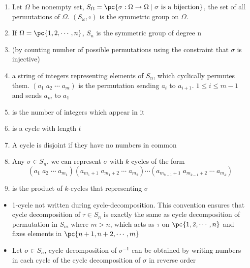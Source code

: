 \documentclass[11pt]{article}
\begin{document}
\begin{definition*}
    \begin{enumerate}
        \item {} Let $\Omega$ be nonempty set, $S_{\Omega} = \pc{\sigma: \Omega \to \Omega \mid \sigma \text{ is a bijection}}$, the set of all permutations of $\Omega$. $(S_{\omega}, \circ)$ is the symmetric group on $\Omega$.
        \item {} If $\Omega = \pc{1,2,\cdots,n}$, $S_n$ is the symmetric group of degree n
        \item {} (by counting number of possible permutations using the constraint that $\sigma$ is injective) 
        \item {} a string of integers representing elements of $S_n$, which cyclically permutes them. $(a_1 \; a_2 \; \cdots \; a_m)$ is the permutation sending $a_i$ to $a_{i+1}$. $1\leq i \leq m-1$ and sends $a_m$ to $a_1$
        \item {} is the number of integers which appear in it
        \item {} is a cycle with length $t$
        \item {} A cycle is disjoint if they have no numbers in common
        \item {} Any $\sigma\in S_n$, we can represent $\sigma$ with $k$ cycles of the form 
        \[
            (a_1 \; a_2\; \cdots\; a_{m_1})(a_{m_1+1}\; a_{m_1+2}\;\cdots \; a_{m_2}) \cdots (a_{m_{k-1}+1}\; a_{m_{k-1}+2} \;\cdots \; a_{m_k})
        \]
        \item {} is the product of $k$-cycles that representing $\sigma$
    \end{enumerate}
    \begin{itemize}
        \item {} 1-cycle not written during cycle-decomposition. This convention ensures that cycle decomposition of $\tau\in S_n$ is exactly the same as cycle decomposition of permutation in $S_{m}$ where $m>n$, which acts as $\tau$ on $\pc{1,2,\cdots,n}$ and fixes elements in $\pc{n+1,n+2,\cdots,m}$
        \item {} Let $\sigma\in S_n$, cycle decomposition of $\sigma^{-1}$ can be obtained by writing numbers in each cycle of the cycle decomposition of $\sigma$ in reverse order

\end{itemize}
\end{definition*}
\end{document}

